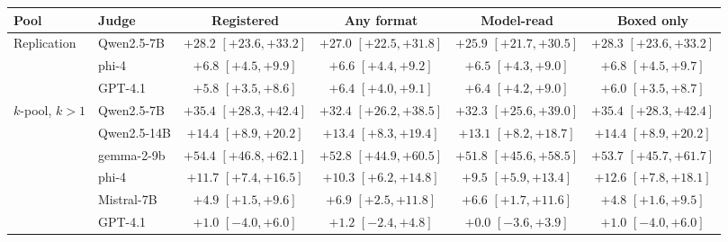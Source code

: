 \begin{tabular}{llcccc}
\toprule
Pool & Judge & Registered & Any format & Model-read & Boxed only \\
\midrule
Replication & Qwen2.5-7B & $+28.2$ {\scriptsize$[+23.6,+33.2]$} & $+27.0$ {\scriptsize$[+22.5,+31.8]$} & $+25.9$ {\scriptsize$[+21.7,+30.5]$} & $+28.3$ {\scriptsize$[+23.6,+33.2]$} \\
 & phi-4 & $+6.8$ {\scriptsize$[+4.5,+9.9]$} & $+6.6$ {\scriptsize$[+4.4,+9.2]$} & $+6.5$ {\scriptsize$[+4.3,+9.0]$} & $+6.8$ {\scriptsize$[+4.5,+9.7]$} \\
 & GPT-4.1 & $+5.8$ {\scriptsize$[+3.5,+8.6]$} & $+6.4$ {\scriptsize$[+4.0,+9.1]$} & $+6.4$ {\scriptsize$[+4.2,+9.0]$} & $+6.0$ {\scriptsize$[+3.5,+8.7]$} \\
\addlinespace
$k$-pool, $k{>}1$ & Qwen2.5-7B & $+35.4$ {\scriptsize$[+28.3,+42.4]$} & $+32.4$ {\scriptsize$[+26.2,+38.5]$} & $+32.3$ {\scriptsize$[+25.6,+39.0]$} & $+35.4$ {\scriptsize$[+28.3,+42.4]$} \\
 & Qwen2.5-14B & $+14.4$ {\scriptsize$[+8.9,+20.2]$} & $+13.4$ {\scriptsize$[+8.3,+19.4]$} & $+13.1$ {\scriptsize$[+8.2,+18.7]$} & $+14.4$ {\scriptsize$[+8.9,+20.2]$} \\
 & gemma-2-9b & $+54.4$ {\scriptsize$[+46.8,+62.1]$} & $+52.8$ {\scriptsize$[+44.9,+60.5]$} & $+51.8$ {\scriptsize$[+45.6,+58.5]$} & $+53.7$ {\scriptsize$[+45.7,+61.7]$} \\
 & phi-4 & $+11.7$ {\scriptsize$[+7.4,+16.5]$} & $+10.3$ {\scriptsize$[+6.2,+14.8]$} & $+9.5$ {\scriptsize$[+5.9,+13.4]$} & $+12.6$ {\scriptsize$[+7.8,+18.1]$} \\
 & Mistral-7B & $+4.9$ {\scriptsize$[+1.5,+9.6]$} & $+6.9$ {\scriptsize$[+2.5,+11.8]$} & $+6.6$ {\scriptsize$[+1.7,+11.6]$} & $+4.8$ {\scriptsize$[+1.6,+9.5]$} \\
 & GPT-4.1 & $+1.0$ {\scriptsize$[-4.0,+6.0]$} & $+1.2$ {\scriptsize$[-2.4,+4.8]$} & $+0.0$ {\scriptsize$[-3.6,+3.9]$} & $+1.0$ {\scriptsize$[-4.0,+6.0]$} \\
\bottomrule
\end{tabular}
